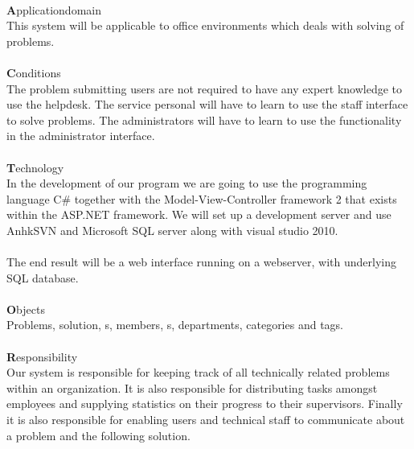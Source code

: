 \ \\
{\Large \textbf{A}}pplicationdomain \\
This system will be applicable to office environments which deals with solving of problems.\\
\ \\
{\Large \textbf{C}}onditions \\ 
The problem submitting users are not required to have any expert knowledge to use the helpdesk. The service personal will have to learn to use the staff interface to solve problems. The administrators will have to learn to use the functionality in the administrator interface.   \\
\ \\
{\Large \textbf{T}}echnology \\
In the development of our program we are going to use the programming language C\# together with the Model-View-Controller framework 2 that exists within the ASP.NET framework. We will set up a development server and use AnhkSVN and Microsoft SQL server along with visual studio 2010.\\
\\
The end result will be a web interface running on a webserver, with underlying SQL database.\\
\ \\
{\Large \textbf{O}}bjects \\
Problems, solution, \aclient s, \astaff members, \admin s, departments, categories and tags. \\
\ \\
{\Large \textbf{R}}esponsibility \\
Our system is responsible for keeping track of all technically related problems within an organization. It is also responsible for distributing tasks amongst employees and supplying statistics on their progress to their supervisors. Finally it is also responsible for enabling users and technical staff to communicate about a problem and the following solution.\\ 
\ \\ 

